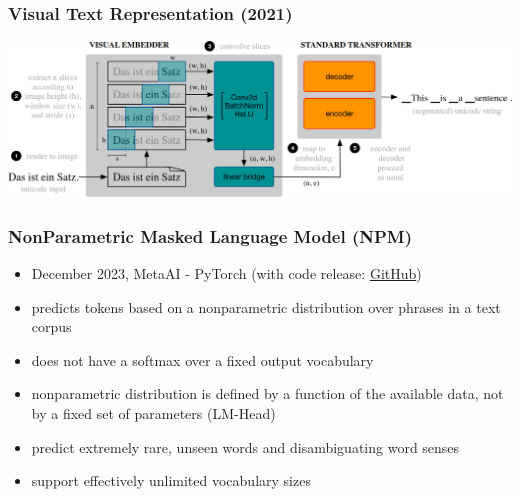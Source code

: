 \documentclass{beamer}
\begin{document}
\begin{frame}
    \frametitle{Visual Text Representation (2021) \cite{vtr_emb}}
    \begin{center}
        \includegraphics[scale=0.95]{img/vtr_emb.png}
    \end{center}
\end{frame}

\begin{frame}
    \frametitle{\textbf{N}on\textbf{P}arametric \textbf{M}asked Language Model (NPM) \cite{nonparametric_mlm}}
    \begin{itemize}
        \item December 2023, MetaAI - PyTorch (with code release: \href{https://github.com/facebookresearch/NPM}{GitHub})
        \item predicts tokens based on a nonparametric distribution over phrases in a text corpus
        \item does not have a softmax over a fixed output vocabulary
        \item nonparametric distribution is defined by a function of the available data, not by a fixed set of parameters (LM-Head)
        \item predict extremely rare, unseen words and disambiguating word senses
        \item support effectively unlimited vocabulary sizes
    \end{itemize}
\end{frame}
\end{document}
